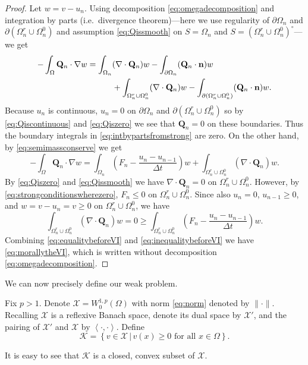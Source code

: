 \documentclass[final,leqno,onefignum,onetabnum]{siamltex1213bueler}
\newcommand\bn{\mathbf{n}}
\newcommand\bQ{\mathbf{Q}}
\newcommand{\Div}{\nabla\cdot}
\renewcommand{\grad}{\nabla}
\newcommand{\ip}[2]{\ensuremath{\left<#1,#2\right>}}
\begin{document}
\begin{proof}  Let $w=v-u_n$.  Using decomposition \eqref{eq:omegadecomposition} and integration by parts (i.e.~divergence theorem)---here we use regularity of $\partial \Omega_n$ and $\partial(\Omega_n^r \cup \Omega_n^0)$ and assumption \eqref{eq:Qissmooth} on $S=\Omega_n$ and $S=(\Omega_n^r \cup \Omega_n^0)^\circ$---we get
\begin{align}
-\int_{\Omega} \bQ_n \cdot \grad w &= \int_{\Omega_n} (\Div \bQ_n) w - \int_{\partial \Omega_n} (\bQ_n \cdot \bn) w \label{eq:intbypartsfromstrong} \\
  &\qquad\quad + \int_{\Omega_n^r \cup \Omega_n^0} (\Div \bQ_n) w - \int_{\partial(\Omega_n^r \cup \Omega_n^0)} (\bQ_n \cdot \bn) w. \notag
\end{align}
Because $u_n$ is continuous, $u_n=0$ on $\partial \Omega_n$ and $\partial(\Omega_n^r \cup \Omega_n^0)$ so by \eqref{eq:Qiscontinuous} and \eqref{eq:Qiszero} we see that $\bQ_n=0$ on these boundaries.  Thus the boundary integrals in \eqref{eq:intbypartsfromstrong} are zero.  On the other hand, by \eqref{eq:semimassconserve} we get
\begin{equation}
-\int_{\Omega} \bQ_n \cdot \grad w = \int_{\Omega_n} \left(F_n - \frac{u_n - u_{n-1}}{\Delta t}\right) w + \int_{\Omega_n^r \cup \Omega_n^0} (\Div \bQ_n) w. \label{eq:equalitybeforeVI}
\end{equation}
By \eqref{eq:Qiszero} and \eqref{eq:Qissmooth} we have $\Div \bQ_n=0$ on $\Omega_n^r \cup \Omega_n^0$.  However, by \eqref{eq:strongconditionswherezero}, $F_n \le 0$ on $\Omega_n^r \cup \Omega_n^0$.  Since also $u_n=0$, $u_{n-1}\ge 0$, and $w = v-u_n = v \ge 0$ on $\Omega_n^r \cup \Omega_n^0$, we have
\begin{equation}
    \int_{\Omega_n^r \cup \Omega_n^0} (\Div \bQ_n) w = 0 \ge \int_{\Omega_n^r \cup \Omega_n^0} \left(F_n - \frac{u_n - u_{n-1}}{\Delta t}\right) w. \label{eq:inequalitybeforeVI}
\end{equation}
Combining \eqref{eq:equalitybeforeVI} and \eqref{eq:inequalitybeforeVI} we have \eqref{eq:morallytheVI}, which is written without decomposition \eqref{eq:omegadecomposition}.
\end{proof}

\medskip
We can now precisely define our weak problem.

\medskip
\begin{definition}  Fix $p>1$.  Denote $\mathcal{X} = W_0^{1,p}(\Omega)$ with norm \eqref{eq:norm} denoted by $\|\cdot\|$.  Recalling $\mathcal{X}$ is a reflexive Banach space, denote its dual space by $\mathcal{X}'$, and the pairing of $\mathcal{X}'$ and $\mathcal{X}$ by $\ip{\cdot}{\cdot}$.  Define
    $$\mathcal{K} = \left\{v \in \mathcal{X} \,\big|\, v(x) \ge 0 \text{ for all } x \in \Omega\right\}.$$
\end{definition}
It is easy to see that $\mathcal{K}$ is a closed, convex subset of $\mathcal{X}$.  
\end{document}
